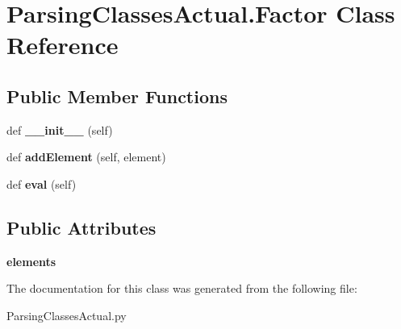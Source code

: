 \hypertarget{class_parsing_classes_actual_1_1_factor}{}\section{Parsing\+Classes\+Actual.\+Factor Class Reference}
\label{class_parsing_classes_actual_1_1_factor}
\subsection*{Public Member Functions}
\begin{DoxyCompactItemize}
\item 
\mbox{\label{class_parsing_classes_actual_1_1_factor_ad0bf99ed1dc466e9994adbca9f507d55}} 
def {\bfseries \+\_\+\+\_\+init\+\_\+\+\_\+} (self)
\item 
\mbox{\label{class_parsing_classes_actual_1_1_factor_a6dfb419731bf782dd7361c66a783df0d}} 
def {\bfseries add\+Element} (self, element)
\item 
\mbox{\label{class_parsing_classes_actual_1_1_factor_a7c0779ac99786001a11b9a0ae6db5896}} 
def {\bfseries eval} (self)
\end{DoxyCompactItemize}
\subsection*{Public Attributes}
\begin{DoxyCompactItemize}
\item 
\mbox{\label{class_parsing_classes_actual_1_1_factor_a0e252f30c9cc0e8016d765a1ee7028b4}} 
{\bfseries elements}
\end{DoxyCompactItemize}


The documentation for this class was generated from the following file\+:\begin{DoxyCompactItemize}
\item 
Parsing\+Classes\+Actual.\+py\end{DoxyCompactItemize}
